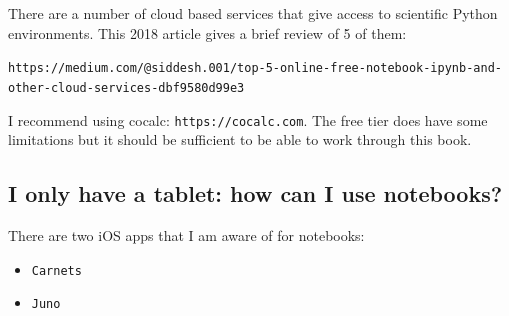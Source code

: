 There are a number of cloud based services that give access to scientific Python
environments. This 2018 article gives a brief review of 5 of them:

\texttt{https://medium.com/@siddesh.001/top-5-online-free-notebook-ipynb-and-other-cloud-services-dbf9580d99e3}

I recommend using cocalc: \texttt{https://cocalc.com}. The free tier does have some
limitations but it should be sufficient to be able to work through this book.


\subsection{I only have a tablet: how can I use notebooks?}
\label{\detokenize{tools-for-mathematics/01-using-notebooks/why/main:i-only-have-a-tablet-how-can-i-use-notebooks}}

There are two iOS apps that I am aware of for notebooks:
\begin{itemize}
\item 

\texttt{Carnets}

\item 

\texttt{Juno}

\end{itemize}
